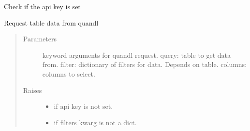 \documentclass[letterpaper,10pt,english]{sphinxmanual}
\begin{document}
\begin{fulllineitems}
\begin{fulllineitems}
\end{fulllineitems}


\begin{fulllineitems}
\label{\detokenize{dalio.external:dalio.external.web.QuandlAPI.check}}
Check if the api key is set

\end{fulllineitems}


\begin{fulllineitems}
\label{\detokenize{dalio.external:dalio.external.web.QuandlAPI.request}}
Request table data from quandl
\begin{quote}\begin{description}
\item[{Parameters}] \leavevmode
{} \textendash{} keyword arguments for quandl request.
query: table to get data from.
filter: dictionary of filters for data. Depends on table.
columns: columns to select.

\item[{Raises}] \leavevmode\begin{itemize}
\item {} 
 \textendash{} if api key is not set.

\item {} 
 \textendash{} if filters kwarg is not a dict.

\end{itemize}

\end{description}\end{quote}

\end{fulllineitems}


\end{fulllineitems}

\end{document}

